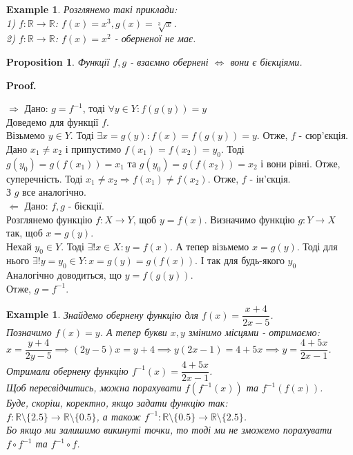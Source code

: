 \documentclass[a4paper, 14pt]{article}
\makeatletter
\def\qed{$\blacksquare$}
\def\rightproof{$\boxed{\Rightarrow}$ }
\theoremstyle{theoremdd}
\theoremstyle{theoremdd}
\theoremstyle{theoremdd}
\theoremstyle{theoremdd}
\newtheorem{example}[theorem]{Example}
\theoremstyle{theoremdd}
\newtheorem{proposition}[theorem]{Proposition}
\theoremstyle{theoremdd}
\theoremstyle{theoremdd}
\theoremstyle{theoremdd}
\renewenvironment{proof}[1][Proof.\\]{\par
\pushQED{\hfill \qed}%
\normalfont \topsep6\p@\@plus6\p@\relax
\trivlist
\item\relax
{\bfseries
#1\@addpunct{.}}\hspace\labelsep\ignorespaces
}{%
\popQED\endtrivlist\@endpefalse
}
\makeatother
\begin{document}
	\begin{example} Розглянемо такі приклади:\\
	1) $f: \mathbb{R} \to \mathbb{R}$: \hspace{1cm} $f(x) = x^3, g(x) = \sqrt[3]{x}$. \\
	2) $f: \mathbb{R} \to \mathbb{R}$: \hspace{1cm}
	$f(x) = x^2$ - оберненої не має.
	\end{example}
	
	\begin{proposition}
	Функції $f,g$ - взаємно обернені $\iff$ вони є бієкціями.
	\end{proposition}
	
	\begin{proof}
	\rightproof Дано: $g = f^{-1}$, тоді $\forall y \in Y: f(g(y)) = y$\\
	Доведемо для функції $f$.\\
	Візьмемо $y \in Y$. Тоді $\exists x = g(y): f(x) = f(g(y)) = y$. Отже, $f$ - сюр'єкція.\\
	Дано $x_1 \neq x_2$ і припустимо $f(x_1) = f(x_2) = y_0$. Тоді $g(y_0) = g(f(x_1)) = x_1$ та $g(y_0) = g(f(x_2)) = x_2$ і вони рівні. Отже, суперечність. Тоді $x_1 \neq x_2 \Rightarrow f(x_1) \neq f(x_2)$. Отже, $f$ - ін'єкція.\\
	З $g$ все аналогічно.
	\bigskip \\
	$\boxed{\Leftarrow}$ Дано: $f,g$ - бієкції.\\
	Розглянемо функцію $f: X \to Y$, щоб $y = f(x)$. Визначимо функцію $g: Y \to X$ так, щоб $x = g(y)$.\\
	Нехай $y_0 \in Y$. Тоді $\exists! x \in X: y = f(x)$. А тепер візьмемо $x = g(y)$. Тоді для нього $\exists! y = y_0 \in Y: x = g(y) = g(f(x))$. І так для будь-якого $y_0$\\
	Аналогічно доводиться, що $y = f(g(y))$.\\
	Отже, $g = f^{-1}$.
	\end{proof}
	
	\begin{example} Знайдемо обернену функцію для $f(x) = \dfrac{x+4}{2x-5}$.\\
	Позначимо $f(x) = y$. А тепер букви $x,y$ змінимо місцями - отримаємо:\\
	$x = \dfrac{y+4}{2y-5} \implies (2y-5)x = y+4 \implies y(2x-1) = 4+5x \implies y = \dfrac{4+5x}{2x-1}$.\\
	Отримали обернену функцію $f^{-1}(x) = \dfrac{4+5x}{2x-1}$.\\
	Щоб пересвідчитись, можна порахувати $f(f^{-1}(x))$ та $f^{-1}(f(x))$.
	\bigskip \\
	Буде, скоріш, коректно, якщо задати функцію так: \\ $f: \mathbb{R} \setminus \{2.5\} \to \mathbb{R} \setminus \{0.5\}$, а також $f^{-1}: \mathbb{R} \setminus \{0.5\} \to \mathbb{R} \setminus \{2.5\}$.\\ 
	Бо якщо ми залишимо викинуті точки, то тоді ми не зможемо порахувати $f \circ f^{-1}$ та $f^{-1} \circ f$.
	\end{example}
	
\end{document}
